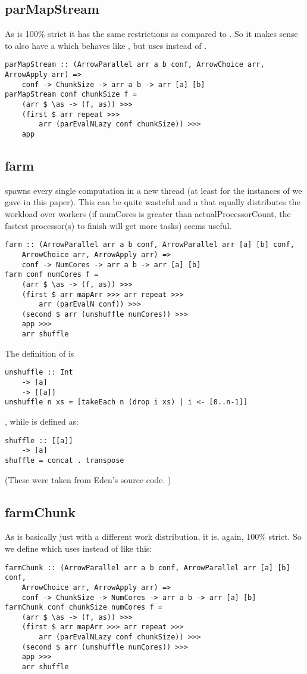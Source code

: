 \subsection{parMapStream}
As  is 100\% strict it has the same restrictions as  compared to . So it makes sense to also have a  which behaves like , but uses  instead of .
\begin{lstlisting}[frame=htrbl]
parMapStream :: (ArrowParallel arr a b conf, ArrowChoice arr, ArrowApply arr) =>
	conf -> ChunkSize -> arr a b -> arr [a] [b]
parMapStream conf chunkSize f =
	(arr $ \as -> (f, as)) >>>
	(first $ arr repeat >>>
		arr (parEvalNLazy conf chunkSize)) >>>
	app
\end{lstlisting}

\subsection{farm}
 spawns every single computation in a new thread (at least for the instances of  we gave in this paper). This can be quite wasteful and a  that equally distributes the workload over  workers (if numCores is greater than actualProcessorCount, the fastest processor(s) to finish will get more tasks) seems useful.
\begin{lstlisting}[frame=htrbl]
farm :: (ArrowParallel arr a b conf, ArrowParallel arr [a] [b] conf,
	ArrowChoice arr, ArrowApply arr) =>
	conf -> NumCores -> arr a b -> arr [a] [b]
farm conf numCores f =
	(arr $ \as -> (f, as)) >>>
	(first $ arr mapArr >>> arr repeat >>>
		arr (parEvalN conf)) >>>
	(second $ arr (unshuffle numCores)) >>>
	app >>>
	arr shuffle
\end{lstlisting}
The definition of  is
\begin{lstlisting}[frame=htrbl]
unshuffle :: Int
	-> [a]
	-> [[a]]
unshuffle n xs = [takeEach n (drop i xs) | i <- [0..n-1]]
\end{lstlisting}
, while  is defined as:
\begin{lstlisting}[frame=htrbl]
shuffle :: [[a]]
	-> [a]
shuffle = concat . transpose
\end{lstlisting}
(These were taken from Eden's source code. \cite{eden_skel_shuffle})

\subsection{farmChunk}
As  is basically just  with a different work distribution, it is, again, 100\% strict. So we define  which uses  instead of  like this:
\begin{lstlisting}[frame=htrbl]
farmChunk :: (ArrowParallel arr a b conf, ArrowParallel arr [a] [b] conf,
	ArrowChoice arr, ArrowApply arr) =>
	conf -> ChunkSize -> NumCores -> arr a b -> arr [a] [b]
farmChunk conf chunkSize numCores f =
	(arr $ \as -> (f, as)) >>>
	(first $ arr mapArr >>> arr repeat >>>
		arr (parEvalNLazy conf chunkSize)) >>>
	(second $ arr (unshuffle numCores)) >>>
	app >>>
	arr shuffle
\end{lstlisting}